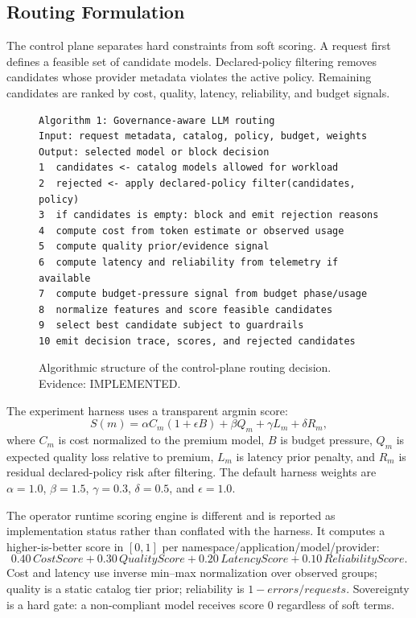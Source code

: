 \documentclass[10pt,journal,compsoc]{IEEEtran}
\begin{document}
\subsection{Routing Formulation}
The control plane separates hard constraints from soft scoring. A request first
defines a feasible set of candidate models. Declared-policy filtering removes
candidates whose provider metadata violates the active policy. Remaining
candidates are ranked by cost, quality, latency, reliability, and budget signals.

\begin{figure}[t]
\small
\begin{verbatim}
Algorithm 1: Governance-aware LLM routing
Input: request metadata, catalog, policy, budget, weights
Output: selected model or block decision
1  candidates <- catalog models allowed for workload
2  rejected <- apply declared-policy filter(candidates, policy)
3  if candidates is empty: block and emit rejection reasons
4  compute cost from token estimate or observed usage
5  compute quality prior/evidence signal
6  compute latency and reliability from telemetry if available
7  compute budget-pressure signal from budget phase/usage
8  normalize features and score feasible candidates
9  select best candidate subject to guardrails
10 emit decision trace, scores, and rejected candidates
\end{verbatim}
\caption{Algorithmic structure of the control-plane routing decision. Evidence:
IMPLEMENTED.}
\label{fig:algorithm}
\end{figure}

The experiment harness uses a transparent argmin score:
\begin{equation}
S(m)=\alpha C_m(1+\epsilon B)+\beta Q_m+\gamma L_m+\delta R_m,
\end{equation}
where $C_m$ is cost normalized to the premium model, $B$ is budget pressure,
$Q_m$ is expected quality loss relative to premium, $L_m$ is latency prior
penalty, and $R_m$ is residual declared-policy risk after filtering. The default
harness weights are $\alpha=1.0$, $\beta=1.5$, $\gamma=0.3$, $\delta=0.5$, and
$\epsilon=1.0$.

The operator runtime scoring engine is different and is reported as
implementation status rather than conflated with the harness. It computes a
higher-is-better score in $[0,1]$ per namespace/application/model/provider:
\begin{equation}
0.40\,CostScore + 0.30\,QualityScore + 0.20\,LatencyScore +
0.10\,ReliabilityScore.
\end{equation}
Cost and latency use inverse min--max normalization over observed groups;
quality is a static catalog tier prior; reliability is $1-errors/requests$.
Sovereignty is a hard gate: a non-compliant model receives score 0 regardless of
soft terms.
\end{document}
